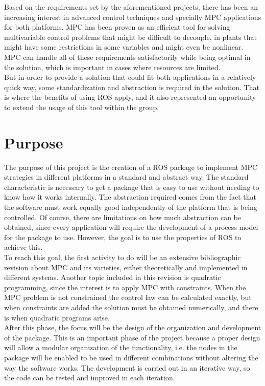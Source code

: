 Based on the requirements set by the aforementioned projects, there has been an increasing interest in advanced control techniques and specially MPC applications for both platforms. MPC has been proven as an efficient tool for solving multivariable control problems that might be difficult to decouple, in plants that might have some restrictions in some variables and might even be nonlinear. MPC can handle all of these requirements satisfactorily while being optimal in the solution, which is important in cases where resources are limited.\\




But in order to provide a solution that could fit both applications in a relatively quick way, some standardization and abstraction is required in the solution. That is where the benefits of using ROS apply, and it also represented an opportunity to extend the usage of this tool within the group.


\section{Purpose}

The purpose of this project is the creation of a ROS package to implement MPC strategies in different platforms in a standard and abstract way. The standard characteristic is necessary to get a package that is easy to use without needing to know how it works internally. The abstraction required comes from the fact that the software must work equally good independently of the platform that is being controlled. Of course, there are limitations on how much abstraction can be obtained, since every application will require the development of a process model for the package to use. However, the goal is to use the properties of ROS to achieve this.\\

To reach this goal, the first activity to do will be an extensive bibliographic revision about MPC and its varieties, either theoretically and implemented in different systems. Another topic included in this revision is quadratic programming, since the interest is to apply MPC with constraints. When the MPC problem is not constrained the control law can be calculated exactly, but when constraints are added the solution must be obtained numerically, and there is when quadratic programs arise. \\

After this phase, the focus will be the design of the organization and development of the package. This is an important phase of the project because a proper design will allow a modular organization of the functionality, i.e. the nodes in the package will be enabled to be used in different combinations without altering the way the software works. The development is carried out in an iterative way, so the code can be tested and improved in each iteration. \\

